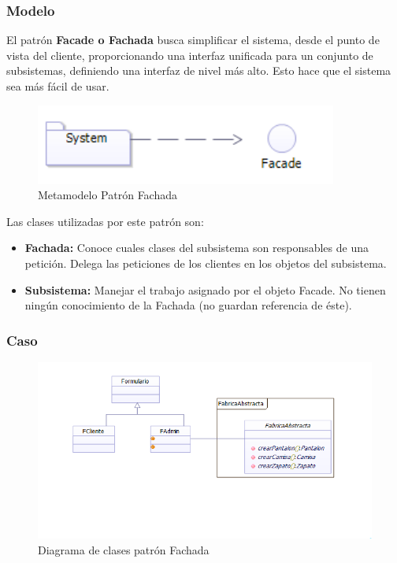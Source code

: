 \subsubsection{Modelo}

El patrón \textbf{Facade o Fachada} busca simplificar el sistema, desde el punto de vista del cliente, proporcionando una interfaz unificada para un conjunto de subsistemas, definiendo una interfaz de nivel más alto. Esto hace que el sistema sea más fácil de usar.

\begin{figure}[th!]
	\centering
	\includegraphics[width=0.6\linewidth]{arquitectura/imagenes/modeloFachada}
	\caption{Metamodelo Patrón Fachada}
	\label{fig:metamodelo patron fachada}
\end{figure}


Las clases utilizadas por este patrón son:
\begin{itemize}
	\item \textbf{Fachada: }Conoce cuales clases del subsistema son responsables de una petición. Delega las peticiones de los clientes en los objetos del subsistema.
	\item \textbf{Subsistema: }Manejar el trabajo asignado por el objeto Facade. No tienen ningún conocimiento de la Fachada (no guardan referencia de éste).
\end{itemize}


\subsubsection{Caso}
\begin{figure}[h!]
	\centering
	\includegraphics[width=0.8\linewidth]{arquitectura/imagenes/DiagramaFachada}
	\caption{Diagrama de clases patrón Fachada}
\end{figure}

